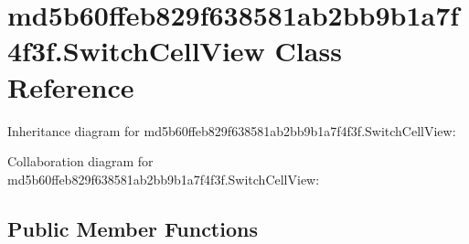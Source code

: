 \hypertarget{classmd5b60ffeb829f638581ab2bb9b1a7f4f3f_1_1_switch_cell_view}{}\section{md5b60ffeb829f638581ab2bb9b1a7f4f3f.\+Switch\+Cell\+View Class Reference}
\label{classmd5b60ffeb829f638581ab2bb9b1a7f4f3f_1_1_switch_cell_view}


Inheritance diagram for md5b60ffeb829f638581ab2bb9b1a7f4f3f.\+Switch\+Cell\+View\+:


Collaboration diagram for md5b60ffeb829f638581ab2bb9b1a7f4f3f.\+Switch\+Cell\+View\+:
\subsection*{Public Member Functions}
